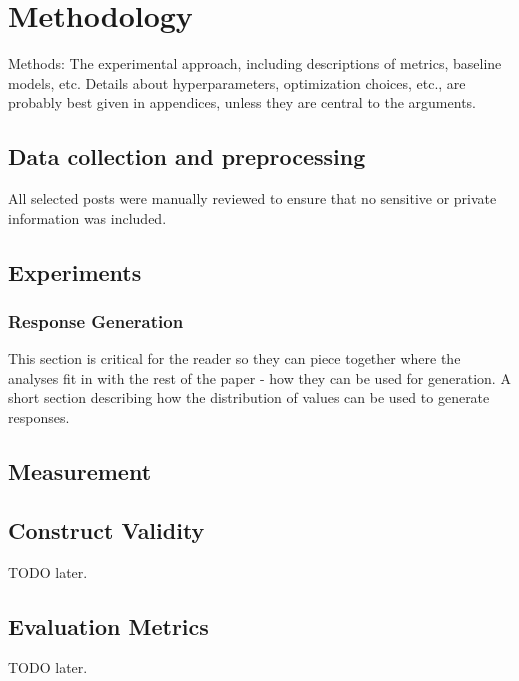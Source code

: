 
\section{Methodology}\label{sec:Methodology}
\textcolor{black!30}{Methods: The experimental approach, including descriptions of metrics, baseline models, etc. Details about hyperparameters, optimization choices, etc., are probably best given in appendices, unless they are central to the arguments.}

\subsection{Data collection and preprocessing}
All selected posts were manually reviewed to ensure that no sensitive or private information was included. 
\textcolor{black!30}{\lipsum[30-33]}

\subsection{Experiments}
\textcolor{black!30}{\lipsum[12-14]}

\subsubsection{Response Generation}
\textcolor{black!40}{This section is critical for the reader so they can piece together where the analyses fit in with the rest of the paper - how they can be used for generation. A short section describing how the distribution of values can be used to generate responses.}

\subsection{Measurement}
\textcolor{black!30}{\lipsum[14-15]}

\subsection{Construct Validity}
TODO later.

\subsection{Evaluation Metrics}
TODO later.




